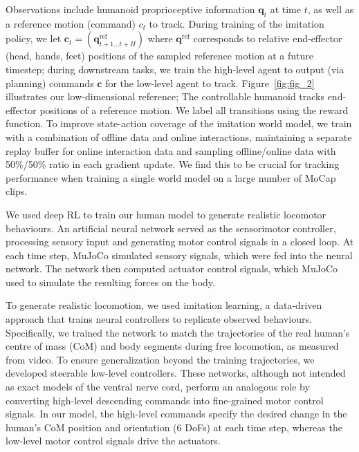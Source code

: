 \documentclass[sn-mathphys-num]{sn-jnl}%
\theoremstyle{thmstyleone}	%
\theoremstyle{thmstyletwo}	%
\theoremstyle{thmstylethree}	%
\begin{document}
Observations include humanoid proprioceptive information $ \mathbf{q}_t $ at time $ t $, as well as a reference motion (command) $ c_t $ to track.
During training of the imitation policy, we let $ \mathbf{c}_t = (\mathbf{q}_{t+1...t+H}^\text{ref}) $ where $ \mathbf{q}^\text{ref} $ corresponds to relative end-effector (head, hands, feet) positions of the sampled reference motion at a future timestep;
during downstream tasks, we train the high-level agent to output (via planning) commands $ \mathbf{c} $ for the low-level agent to track.
Figure~\ref{fig:fig_2} illustrates our low-dimensional reference; 
The controllable humanoid tracks end-effector positions of a reference motion.
We label all transitions using the reward function.
To improve state-action coverage of the imitation world model, we train with a combination of offline data and online interactions, maintaining a separate replay buffer for online interaction data and sampling offline/online data with 50\%/50\% ratio in each gradient update.
We find this to be crucial for tracking performance when training a single world model on a large number of MoCap clips.



We used deep RL to train our human model to generate realistic locomotor behaviours.
An artificial neural network served as the sensorimotor controller, processing sensory input and generating motor control signals in a closed loop. 
At each time step, MuJoCo simulated sensory signals, which were fed into the neural network. 
The network then computed actuator control signals, which MuJoCo used to simulate the resulting forces on the body.



To generate realistic locomotion, we used imitation learning\cite{peng2018deepmimic,hasenclever2020comic}, a data-driven approach that trains neural controllers to replicate observed behaviours. 
Specifically, we trained the network to match the trajectories of the real human's centre of mass (CoM) and body segments during free locomotion, as measured from video. 
To ensure generalization beyond the training trajectories, we developed steerable low-level controllers\cite{merel2019hierarchical}. 
These networks, although not intended as exact models of the ventral nerve cord, perform an analogous role by converting high-level descending commands into fine-grained motor control signals. 
In our model, the high-level commands specify the desired change in the human's CoM position and orientation (6 DoFs) at each time step, whereas the low-level motor control signals drive the actuators.
\end{document}
